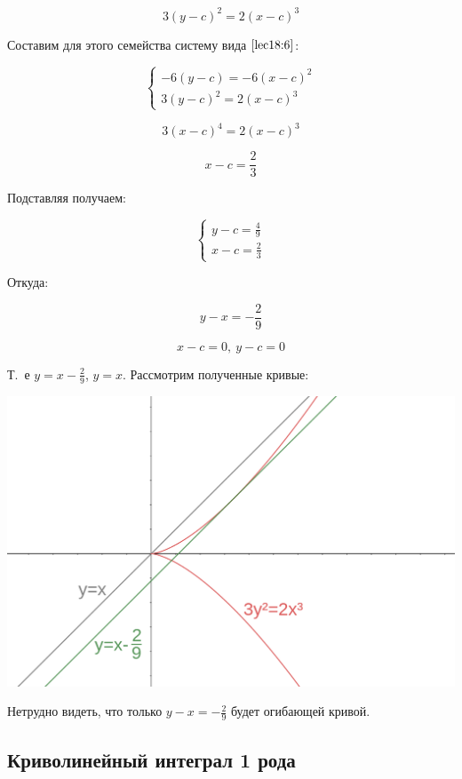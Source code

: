 \documentclass[../../main.tex]{subfiles}
\begin{document}
 \begin{exmp}
\[ 3\left( y - c\right)^2 = 2 \left( x-c \right)^3  \]

Составим для этого семейства систему вида $\eqref{lec18:6}$:

\[ \begin{cases}
-6\left( y - c\right)  = -6 \left( x - c\right)^2\\
3\left( y - c\right)^2 = 2 \left( x - c \right)^3
\end{cases}  \]

\[ 3\left( x-c\right)^4  = 2 \left( x-c\right)^3 \]

\[ x-c = \frac{2}{3} \]

Подставляя получаем:

\[ \begin{cases}
y-c  = \frac{4}{9}\\
x-c = \frac{2}{3}
\end{cases}  \]

Откуда:

\[ y - x = -\frac{2}{9} \]

\[ x-c = 0,\ y - c = 0 \]

Т.~е $y  = x - \frac{2}{9}$, $y=x$. Рассмотрим полученные кривые:

\begin{center} \includegraphics[scale=0.8]{hiperbola.png} \end{center}


Нетрудно видеть, что только $y - x = -\frac{2}{9}$ будет огибающей кривой.

\end{exmp}


\subsection{Криволинейный интеграл 1 рода}
\end{document}
